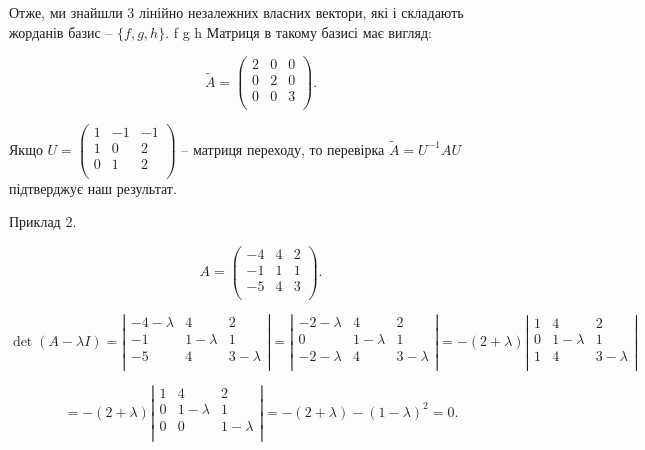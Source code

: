 Отже, ми знайшли 3 лінійно незалежних власних вектори, які і складають
жорданів базис -- $\{f, g, h\}$. f g h Матриця в такому базисі має вигляд:

$$\tilde{A} = \begin{pmatrix}
	2 & 0 & 0 \\
	0 & 2 & 0 \\
	0 & 0 & 3 \\
\end{pmatrix}. $$

Якщо $U = \begin{pmatrix}
	1 & -1 & -1 \\
	1 &  0 &  2 \\
	0 &  1 &  2 \\
\end{pmatrix}$ -- матриця переходу, то перевірка $\tilde{A} = U^{-1} A U$
підтверджує наш результат.

Приклад 2.

$$A = \begin{pmatrix}
	-4 &  4 &  2 \\
	-1 &  1 &  1 \\
	-5 &  4 &  3 \\
\end{pmatrix}. $$

$$\det(A - \lambda I) = \left| \begin{matrix}
	-4 - \lambda & 4           & 2 \\
	-1           & 1 - \lambda & 1 \\
	-5           & 4           & 3-\lambda\\
\end{matrix} \right| = \left| \begin{matrix}
	-2 - \lambda & 4           & 2 \\
	0            & 1 - \lambda & 1 \\
	-2 - \lambda & 4           & 3-\lambda\\
\end{matrix} \right| = -(2 + \lambda) \left| \begin{matrix}
	1 & 4           & 2 \\
	0 & 1 - \lambda & 1 \\
	1 & 4           & 3-\lambda\\
\end{matrix} \right| $$

$$= -(2 + \lambda) \left| \begin{matrix}
	1 & 4           & 2 \\
	0 & 1 - \lambda & 1 \\
	0 & 0           & 1-\lambda\\
\end{matrix} \right| = -(2 + \lambda)-(1 - \lambda)^2 = 0.$$

